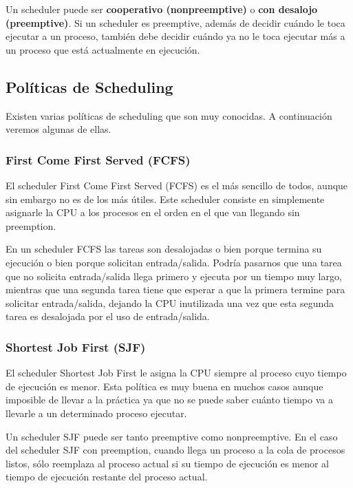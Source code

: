 \documentclass{article}
\begin{document}
Un scheduler puede ser \textbf{cooperativo (nonpreemptive)} o \textbf{con desalojo (preemptive)}. Si un scheduler es preemptive, adem\'as de decidir cu\'ando le toca ejecutar a un proceso, tambi\'en debe decidir cu\'ando ya no le toca ejecutar m\'as a un proceso que est\'a actualmente en ejecuci\'on.

\subsection{Pol\'iticas de Scheduling}

Existen varias pol\'iticas de scheduling que son muy conocidas. A continuaci\'on veremos algunas de ellas.

\subsubsection{First Come First Served (FCFS)}

El scheduler First Come First Served (FCFS) es el m\'as sencillo de todos, aunque sin embargo no es de los m\'as \'utiles. Este scheduler consiste en simplemente asignarle la CPU a los procesos en el orden en el que van llegando sin preemption.

En un scheduler FCFS las tareas son desalojadas o bien porque termina su ejecuci\'on o bien porque solicitan entrada/salida. Podr\'ia pasarnos que una tarea que no solicita entrada/salida llega primero y ejecuta por un tiempo muy largo, mientras que una segunda tarea tiene que esperar a que la primera termine para solicitar entrada/salida, dejando la CPU inutilizada una vez que esta segunda tarea es desalojada por el uso de entrada/salida.

\subsubsection{Shortest Job First (SJF)}

El scheduler Shortest Job First le asigna la CPU siempre al proceso cuyo tiempo de ejecuci\'on es menor. Esta pol\'itica es muy buena en muchos casos aunque imposible de llevar a la pr\'actica ya que no se puede saber cu\'anto tiempo va a llevarle a un determinado proceso ejecutar.

Un scheduler SJF puede ser tanto preemptive como nonpreemptive. En el caso del scheduler SJF con preemption, cuando llega un proceso a la cola de procesos listos, s\'olo reemplaza al proceso actual si su tiempo de ejecuci\'on es menor al tiempo de ejecuci\'on restante del proceso actual.
\end{document}
